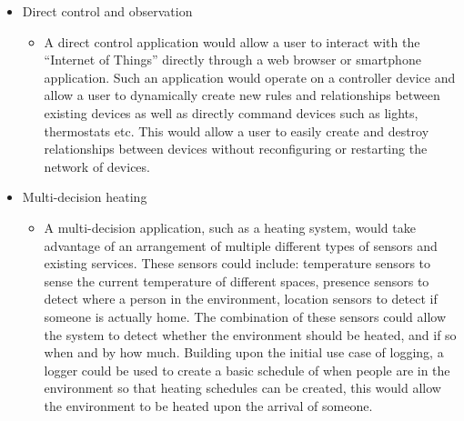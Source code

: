 \begin{itemize}
\begin{itemize}
	\end{itemize}
	\item Direct control and observation
	\begin{itemize}
		\item A direct control application would allow a user to interact with the ``Internet of Things'' directly through a web browser or smartphone application. Such an application would operate on a controller device and allow a user to dynamically create new rules and relationships between existing devices as well as directly command devices such as lights, thermostats etc.
		This would allow a user to easily create and destroy relationships between devices without reconfiguring or restarting the network of devices.
	\end{itemize}
	\item Multi-decision heating
	\begin{itemize}
		\item A multi-decision application, such as a heating system, would take advantage of an arrangement of multiple different types of sensors and existing services. These sensors could include: temperature sensors to sense the current temperature of different spaces, presence sensors to detect where a person in the environment, location sensors to detect if someone is actually home. The combination of these sensors could allow the system to detect whether the environment should be heated, and if so when and by how much. Building upon the initial use case of logging, a logger could be used to create a basic schedule of when people are in the environment so that heating schedules can be created, this would allow the environment to be heated upon the arrival of someone.
	\end{itemize}
\end{itemize}

